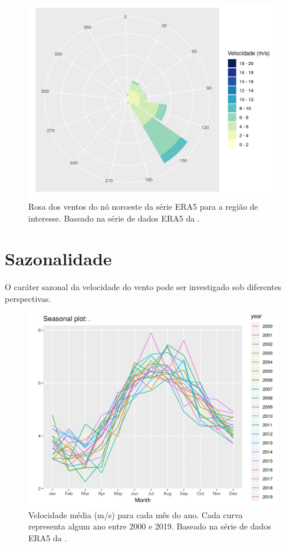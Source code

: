 \documentclass[
	12pt,				%
	openright,			%
	oneside,			%
	a4paper,			%
	english,			%
	french,				%
	spanish,			%
	brazil				%
	]{abntex2}
\begin{document}
\begin{figure}[h]
    \centering
	\includegraphics[width=\textwidth]{windrose}
	\caption{Rosa dos ventos do nó noroeste da série ERA5 para a região de interesse. Baseado na série de dados ERA5 da \cite{era5}.}
	\label{fig:windrose}
\end{figure}
\FloatBarrier

\section{Sazonalidade}

O caráter sazonal da velocidade do vento pode ser investigado sob diferentes perspectivas. 

\begin{figure}[h]
    \centering
	\includegraphics[width=\textwidth]{season_plot}
	\caption{Velocidade média (m/s) para cada mês do ano. Cada curva representa algum ano entre 2000 e 2019. Baseado na série de dados ERA5 da \cite{era5}.}
\end{figure}
\FloatBarrier
\end{document}
